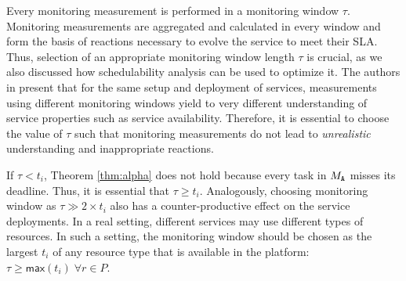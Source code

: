 Every monitoring measurement is performed in a monitoring window $\tau$.
Monitoring measurements are aggregated and calculated in every window and form the basis of reactions necessary to evolve the service to meet their SLA.
Thus, selection of an appropriate monitoring window length $\tau$ is crucial, as we also discussed how schedulability analysis can be used to optimize it.
The authors in \cite{hogben2013defavail} present that for the same setup and deployment of services, measurements using different monitoring windows yield to very different understanding of service properties such as service availability.
Therefore, it is essential to choose the value of $\tau$ such that monitoring measurements do not lead to \emph{unrealistic} understanding and inappropriate reactions.

If $\tau < t_i$, Theorem \ref{thm:alpha} does not hold because every task  in $M_{{\scriptsize\texttt{A}}}$ misses its deadline.
Thus, it is essential that $\tau \geq t_i$.
Analogously, choosing monitoring window as $\tau \gg 2 \times t_i$ also has a counter-productive effect on the service deployments.
% 
In a real setting, different services may use different types of resources.
In such a setting, the monitoring window should be chosen as the largest $t_i$ of any resource type that is available in the platform: $\tau \geq \mathsf{max}(t_i) \; \forall r \in P$.


